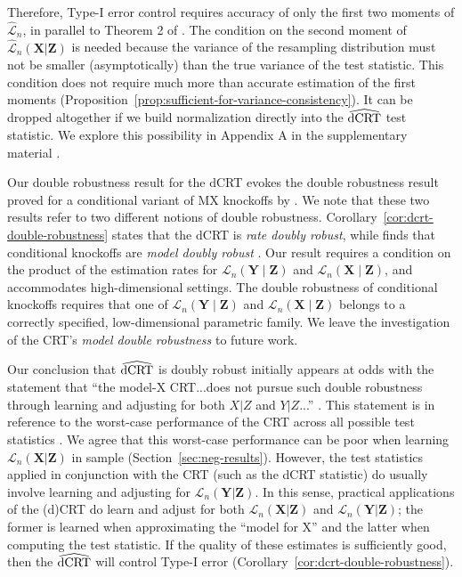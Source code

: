 \documentclass[aos]{imsart}
\theoremstyle{plain}
\theoremstyle{remark}
\newcommand{\prx}{\bm X}								%
\newcommand{\prz}{\bm Z}								%
\newcommand{\pry}{{\bm Y}}								%
\newcommand{\law}{\mathcal L}							%
\newcommand{\lawhat}{\widehat{\mathcal L}}				%
\newcommand{\dCRThat}{\widehat{\textnormal{dCRT}}}		%
\begin{document}
Therefore, Type-I error control requires accuracy of only the first two moments of $\lawhat_n$, in parallel to Theorem 2 of \citet{Katsevich2020a}. The condition on the second moment of $\lawhat_n(\prx|\prz)$ is needed because the variance of the resampling distribution must not be smaller (asymptotically) than the true variance of the test statistic. This condition does not require much more than accurate estimation of the first moments (Proposition~\ref{prop:sufficient-for-variance-consistency}). It can be dropped altogether if we build normalization directly into the $\dCRThat$ test statistic. We explore this possibility in Appendix A in the supplementary material \citep{supplementary}.

Our double robustness result for the dCRT evokes the double robustness result proved for a conditional variant of MX knockoffs by \citet{Huang2019}. We note that these two results refer to two different notions of double robustness. Corollary~\ref{cor:dcrt-double-robustness} states that the dCRT is \textit{rate doubly robust}, while \citet{Huang2019} finds that conditional knockoffs are \textit{model doubly robust} \citep{Smucler2019}. Our result requires a condition on the product of the estimation rates for $\law_n(\pry \mid \prz)$ and $\law_n(\prx \mid \prz)$, and accommodates high-dimensional settings. The double robustness of conditional knockoffs requires that one of $\law_n(\pry \mid \prz)$ and $\law_n(\prx \mid \prz)$ belongs to a correctly specified, low-dimensional parametric family. We leave the investigation of the CRT's \textit{model double robustness} to future work.

Our conclusion that $\dCRThat$ is doubly robust initially appears at odds with the statement that ``the model-X CRT...does not pursue such double robustness through learning and adjusting for both $X|Z$ and $Y|Z$...'' \citep{Li2022}. This statement is in reference to the worst-case performance of the CRT across all possible test statistics \citep{Berrett2019}. We agree that this worst-case performance can be poor when learning $\law_n(\prx|\prz)$ in sample (Section~\ref{sec:neg-results}). However, the test statistics applied in conjunction with the CRT (such as the dCRT statistic) do usually involve learning and adjusting for $\law_n(\pry|\prz)$. In this sense, practical applications of the (d)CRT do learn and adjust for both $\law_n(\prx|\prz)$ and $\law_n(\pry|\prz)$; the former is learned when approximating the ``model for X'' and the latter when computing the test statistic. If the quality of these estimates is sufficiently good, then the $\dCRThat$ will control Type-I error (Corollary~\ref{cor:dcrt-double-robustness}).
\end{document}
